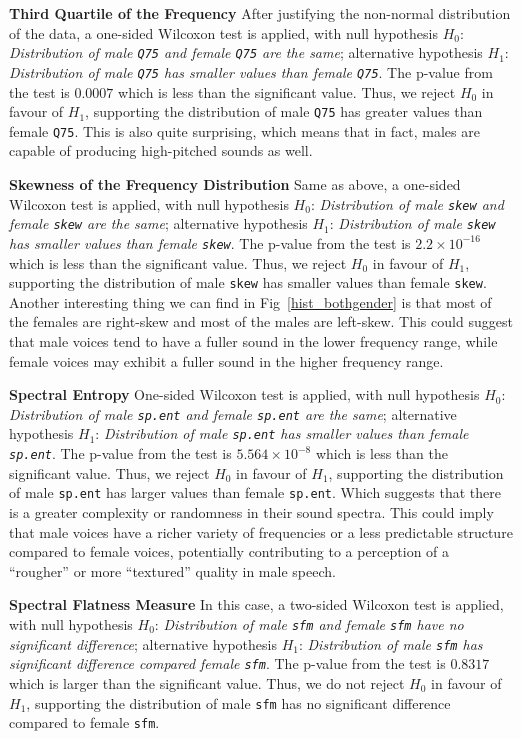 \documentclass{article}
\begin{document}
	\textbf{Third Quartile of the Frequency} After justifying the non-normal distribution of the data, a one-sided Wilcoxon test is applied, with null hypothesis $H_0$: \textit{Distribution of male \texttt{Q75} and female \texttt{Q75} are the same}; alternative hypothesis $H_1$: \textit{Distribution of male \texttt{Q75} has smaller values than female \texttt{Q75}}. The p-value from the test is $0.0007$ which is less than the significant value. Thus, we reject $H_0$ in favour of $H_1$, supporting the distribution of male \texttt{Q75} has greater values than female \texttt{Q75}. This is also quite surprising, which means that in fact, males are capable of producing high-pitched sounds as well.
	
	\textbf{Skewness of the Frequency Distribution} Same as above, a one-sided Wilcoxon test is applied, with null hypothesis $H_0$: \textit{Distribution of male \texttt{skew} and female \texttt{skew} are the same}; alternative hypothesis $H_1$: \textit{Distribution of male \texttt{skew} has smaller values than female \texttt{skew}}. The p-value from the test is $2.2\times 10^{-16}$ which is less than the significant value. Thus, we reject $H_0$ in favour of $H_1$, supporting the distribution of male \texttt{skew} has smaller values than female \texttt{skew}. Another interesting thing we can find in Fig~\ref{hist_bothgender} is that most of the females are right-skew and most of the males are left-skew. This could suggest that male voices tend to have a fuller sound in the lower frequency range, while female voices may exhibit a fuller sound in the higher frequency range.
	
	
	\textbf{Spectral Entropy} One-sided Wilcoxon test is applied, with null hypothesis $H_0$: \textit{Distribution of male \texttt{sp.ent} and female \texttt{sp.ent} are the same}; alternative hypothesis $H_1$: \textit{Distribution of male \texttt{sp.ent} has smaller values than female \texttt{sp.ent}}. The p-value from the test is $5.564\times 10^{-8}$ which is less than the significant value. Thus, we reject $H_0$ in favour of $H_1$, supporting the distribution of male \texttt{sp.ent} has larger values than female \texttt{sp.ent}. Which suggests that there is a greater complexity or randomness in their sound spectra. This could imply that male voices have a richer variety of frequencies or a less predictable structure compared to female voices, potentially contributing to a perception of a ``rougher'' or more ``textured'' quality in male speech. 
	
	\textbf{Spectral Flatness Measure} In this case, a two-sided Wilcoxon test is applied, with null hypothesis $H_0$: \textit{Distribution of male \texttt{sfm} and female \texttt{sfm} have no significant difference}; alternative hypothesis $H_1$: \textit{Distribution of male \texttt{sfm} has significant difference compared female \texttt{sfm}}. The p-value from the test is $0.8317$ which is larger than the significant value. Thus, we do not reject $H_0$ in favour of $H_1$, supporting the distribution of male \texttt{sfm} has no significant difference compared to female \texttt{sfm}.
	
\end{document}
